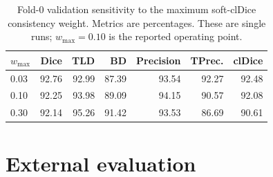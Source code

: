 \begin{table}[htbp]
  \centering
  \footnotesize
  \caption[Consistency-weight sensitivity]{Fold-0 validation sensitivity to the maximum
  soft-clDice consistency weight. Metrics are percentages. These are single runs;
  $w_{\max}=0.10$ is the reported operating point.}
  \label{tab:weight-sensitivity}
  \begin{tabular}{lrrrrrr}
    \toprule
    $w_{\max}$ & Dice & TLD & BD & Precision & TPrec. & clDice \\
    \midrule
    0.03 & 92.76 & 92.99 & 87.39 & 93.54 & 92.27 & 92.48 \\
    0.10 & 92.25 & 93.98 & 89.09 & 94.15 & 90.57 & 92.08 \\
    0.30 & 92.14 & 95.26 & 91.42 & 93.53 & 86.69 & 90.61 \\
    \bottomrule
  \end{tabular}
\end{table}

\section{External evaluation}
\label{sec:external}

